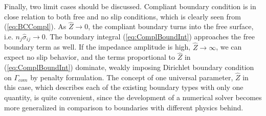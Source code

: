 Finally, two limit cases should be discussed. Compliant boundary condition is in close relation to both free and no slip conditions, which is clearly seen from (\ref{eq:BCCompl}). As $\hat{Z} \to 0$, the compliant boundary turns into the free surface, i.e. $n_j \hat{\sigma}_{ij} \to 0$. The boundary integral (\ref{eq:ComplBoundInt}) approaches the free boundary term as well. If the impedance amplitude is high, $\hat{Z} \to \infty$, we can expect no slip behavior, and the terms proportional to $\hat{Z}$ in (\ref{eq:ComplBoundInt}) dominate, weakly imposing Dirichlet boundary condition on $\Gamma_{com}$ by penalty formulation. The concept of one universal parameter, $\hat{Z}$ in this case, which describes each of the existing boundary types with only one quantity, is quite convenient, since the development of a numerical solver becomes more generalized in comparison to boundaries with different physics behind.
